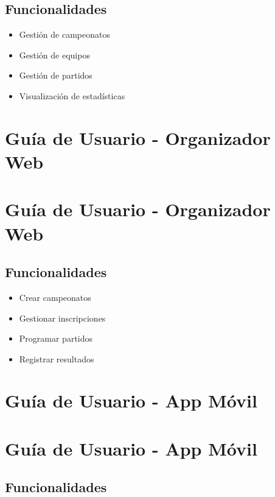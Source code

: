 \documentclass[
  spanish,
  11pt,
  letterpaper,
]{book}
\providecommand{\tightlist}{%
  \setlength{\itemsep}{0pt}\setlength{\parskip}{0pt}}
\begin{document}
\section{Funcionalidades}\label{funcionalidades-1}

\begin{itemize}
\tightlist
\item
  Gestión de campeonatos
\item
  Gestión de equipos
\item
  Gestión de partidos
\item
  Visualización de estadísticas
\end{itemize}

\chapter{Guía de Usuario - Organizador
Web}\label{guuxeda-de-usuario---organizador-web}

\chapter{Guía de Usuario - Organizador
Web}\label{guuxeda-de-usuario---organizador-web-1}

\section{Funcionalidades}\label{funcionalidades-2}

\begin{itemize}
\tightlist
\item
  Crear campeonatos
\item
  Gestionar inscripciones
\item
  Programar partidos
\item
  Registrar resultados
\end{itemize}

\chapter{Guía de Usuario - App
Móvil}\label{guuxeda-de-usuario---app-muxf3vil}

\chapter{Guía de Usuario - App
Móvil}\label{guuxeda-de-usuario---app-muxf3vil-1}

\section{Funcionalidades}\label{funcionalidades-3}
\end{document}
